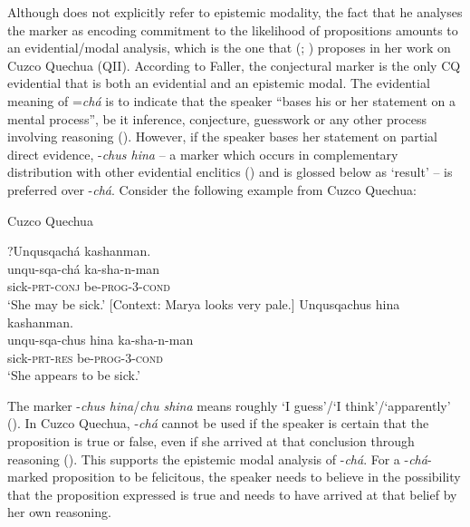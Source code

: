 \documentclass[output=paper]{langscibook}
\begin{document}
Although \citeauthor{Floyd1997} does not explicitly refer to epistemic modality, the fact that he analyses the marker as encoding commitment to the likelihood of propositions amounts to an evidential/modal analysis, which is the one that \citeauthor{Faller2002} (\citeyear{Faller2002}; \citeyear{Faller2007}) proposes in her work on Cuzco Quechua (QII). According to Faller, the conjectural marker is the only CQ evidential that is both an evidential and an epistemic modal. The evidential meaning of =\textit{chá} is to indicate that the speaker “bases his or her statement on a mental process”, be it inference, conjecture, guesswork or any other process involving reasoning (\citealt[176]{Faller2002}). However, if  the speaker bases her statement on partial direct evidence, -\textit{chus hina} – a marker which occurs in complementary distribution with other evidential enclitics (\citealt{Faller2006}) and is glossed below as `result' – is preferred over -\textit{chá}. Consider the following example from Cuzco Quechua:

\newpage
\begin{exe}
	\ex Cuzco Quechua\label{ex:kg2}
	\begin{xlist}
		\ex 
		\glll ?Unqusqachá kashanman.\\
		unqu-sqa-chá ka-sha-n-man\\
		sick-\textsc{prt}-\textsc{conj} be-\textsc{prog}-3-\textsc{cond}\\
		\trans ‘She may be sick.’ [Context: Marya looks very pale.]
		\ex 
		\glll Unqusqachus hina kashanman.\\
		unqu-sqa-chus hina ka-sha-n-man\\
        sick-\textsc{prt}-\textsc{res} {} be-\textsc{prog}-3-\textsc{cond}\\
        \trans ‘She appears to be sick.’ \citep[4]{Faller2007}
	\end{xlist}
\end{exe}

The marker -\textit{chus hina}/\textit{chu shina} means roughly ‘I guess’/‘I think’/‘apparently’ (\citealt[3]{Faller2006}). In Cuzco Quechua, -\textit{chá} cannot be used if the speaker is certain that the proposition is true or false, even if she arrived at that conclusion through reasoning (\citealt[5]{Faller2007}). This supports the epistemic modal analysis of -\textit{chá}. For a -\textit{chá}-marked proposition to be felicitous, the speaker needs to believe in the possibility that the proposition expressed is true and needs to have arrived at that belief by her own reasoning.
\end{document}
